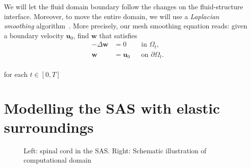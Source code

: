 \documentclass[11pt,a4paper,titlepage]{report}
\begin{document}
We will let the fluid domain boundary follow the changes on the
fluid-structure interface. Moreover, to move the entire domain, we
will use a \emph{Laplacian smoothing}
algorithm~\cite{Winslow1963}. More precisely, our mesh smoothing
equation reads: given a boundary velocity $\mathbf{u}_0$, find
$\mathbf{w}$ that satisfies
\begin{align}
\label{eq:bc:2}
- \Delta \mathbf{w} &= 0 	&& \text{in } \Omega_t, \\
\mathbf{w} &= \mathbf{u}_0 && \text{on } \partial \Omega_t .
\end{align}
\\
for each $t \in [0, T]$


%
%
%

\section{Modelling the SAS with elastic surroundings}

\begin{figure}
  \caption{Left: spinal cord in the SAS. Right: Schematic illustration
    of computational domain}
\end{figure}
\end{document}
